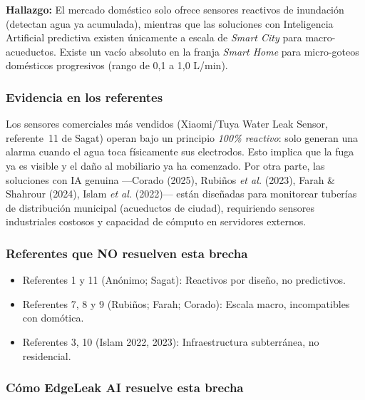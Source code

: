 \documentclass[12pt,a4paper]{article}
\begin{document}
\begin{mdframed}[linecolor=criticalred,linewidth=1pt,backgroundcolor=red!3]
\textbf{Hallazgo:} El mercado doméstico solo ofrece sensores reactivos de inundación
(detectan agua ya acumulada), mientras que las soluciones con Inteligencia Artificial
predictiva existen únicamente a escala de \emph{Smart City} para macro-acueductos.
Existe un vacío absoluto en la franja \emph{Smart Home} para micro-goteos domésticos
progresivos (rango de 0{,}1 a 1{,}0 L/min).
\end{mdframed}

\vspace{0.6em}

\subsubsection{Evidencia en los referentes}

Los sensores comerciales más vendidos (Xiaomi/Tuya Water Leak Sensor, referente~11
de Sagat) operan bajo un principio \textit{100\% reactivo}: solo generan una alarma
cuando el agua toca físicamente sus electrodos. Esto implica que la fuga ya es visible
y el daño al mobiliario ya ha comenzado. Por otra parte, las soluciones con IA genuina
---Corado (2025), Rubiños \textit{et al.} (2023), Farah \& Shahrour (2024), Islam
\textit{et al.} (2022)--- están diseñadas para monitorear tuberías de distribución
municipal (acueductos de ciudad), requiriendo sensores industriales costosos y capacidad
de cómputo en servidores externos.

\subsubsection{Referentes que NO resuelven esta brecha}

\begin{itemize}[nosep]
  \item Referentes 1 y 11 (Anónimo; Sagat): Reactivos por diseño, no predictivos.
  \item Referentes 7, 8 y 9 (Rubiños; Farah; Corado): Escala macro, incompatibles con domótica.
  \item Referentes 3, 10 (Islam 2022, 2023): Infraestructura subterránea, no residencial.
\end{itemize}

\subsubsection{Cómo EdgeLeak AI resuelve esta brecha}
\end{document}
